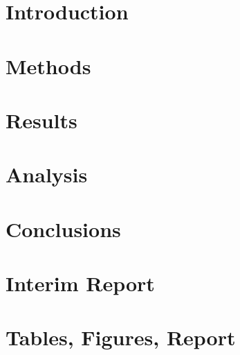 \documentclass[a4paper,12pt,oneside]{book}
\begin{document}
\frontmatter





\mainmatter



\chapter{Introduction}

\chapter{Methods}

\chapter{Results}

\chapter{Analysis}

\chapter{Conclusions}



\backmatter



\chapter[Management of the Project]{Interim Report}
\chapter{Tables, Figures, Report}
\label{appa}


\printnomenclature

\end{document}
